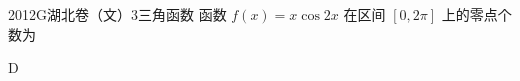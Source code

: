 
\begin{problem}{2012}{G}{湖北卷（文）}{3}{三角函数}
函数 $ f(x)=x\cos 2x $ 在区间 $ [0,2\pi] $ 上的零点个数为
\begin{choices}
\end{choices}
\end{problem}

\begin{answer}
D
\end{answer}

\begin{solutions}

\end{solutions}